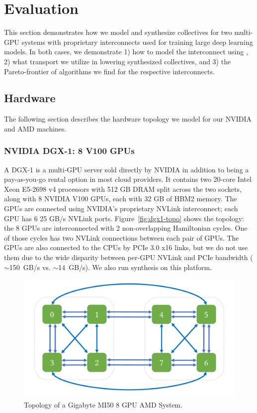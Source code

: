 
\section{Evaluation}
This section demonstrates how we model and synthesize collectives for
two multi-GPU systems with proprietary interconnects used for training
large deep learning models. In both cases, we demonstrate 1) how to
model the interconnect using \tool, 2) what transport we utilize in
lowering synthesized collectives, and 3) the Pareto-frontier of
algorithms we find for the respective interconnects.

\subsection{Hardware}
The following section describes the hardware topology we model for our
NVIDIA and AMD machines.

\subsubsection{NVIDIA DGX-1: 8 V100 GPUs}
A DGX-1 is a multi-GPU server sold directly by NVIDIA in addition to
being a pay-as-you-go rental option in most cloud providers.  It
contains two 20-core Intel Xeon E5-2698 v4 processors with 512 GB DRAM
split across the two sockets, along with 8 NVIDIA V100 GPUs, each with
32 GB of HBM2 memory. The GPUs are connected using NVIDIA's
proprietary NVLink interconnect; each GPU has 6 25 GB/s NVLink ports.
Figure~\ref{fig:dgx1-topo} shows the topology: the 8 GPUs are
interconnected with 2 non-overlapping Hamiltonian cycles.  One of
those cycles has two NVLink connections between each pair of GPUs. The
GPUs are also connected to the CPUs by PCIe 3.0 x16 links, but we do
not use them due to the wide disparity between per-GPU NVLink and PCIe
bandwidth ($\sim$150~GB/s vs. $\sim$14~GB/s). We also run synthesis on
this platform.

\begin{figure}
\includegraphics[page=2,width=\columnwidth]{figures/topos}
\caption{Topology of a Gigabyte MI50 8 GPU AMD System.}
\label{fig:amd-topo}
\end{figure}

